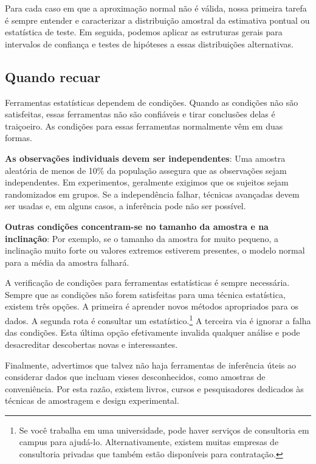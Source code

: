 \documentclass[
]{book}
\theoremstyle{definition}
\theoremstyle{definition}
\theoremstyle{definition}
\theoremstyle{definition}
\theoremstyle{remark}
\begin{document}
Para cada caso em que a aproximação normal não é válida, nossa primeira tarefa é sempre entender e caracterizar a distribuição amostral da estimativa pontual ou estatística de teste. Em seguida, podemos aplicar as estruturas gerais para intervalos de confiança e testes de hipóteses a essas distribuições alternativas.

\hypertarget{whenToRetreat}{%
\subsection{Quando recuar}\label{whenToRetreat}}

Ferramentas estatísticas dependem de condições. Quando as condições não são satisfeitas, essas ferramentas não são confiáveis e tirar conclusões delas é traiçoeiro. As condições para essas ferramentas normalmente vêm em duas formas.

\textbf{As observações individuais devem ser independentes}: Uma amostra aleatória de menos de 10\% da população assegura que as observações sejam independentes. Em experimentos, geralmente exigimos que os sujeitos sejam randomizados em grupos. Se a independência falhar, técnicas avançadas devem ser usadas e, em alguns casos, a inferência pode não ser possível.

\textbf{Outras condições concentram-se no tamanho da amostra e na inclinação}: Por exemplo, se o tamanho da amostra for muito pequeno, a inclinação muito forte ou valores extremos estiverem presentes, o modelo normal para a média da amostra falhará.

A verificação de condições para ferramentas estatísticas é sempre necessária. Sempre que as condições não forem satisfeitas para uma técnica estatística, existem três opções. A primeira é aprender novos métodos apropriados para os dados. A segunda rota é consultar um estatístico.\footnote{Se você trabalha em uma universidade, pode haver serviços de consultoria em campus para ajudá-lo. Alternativamente, existem muitas empresas de consultoria privadas que também estão disponíveis para contratação.} A terceira via é ignorar a falha das condições. Esta última opção efetivamente invalida qualquer análise e pode desacreditar descobertas novas e interessantes.

Finalmente, advertimos que talvez não haja ferramentas de inferência úteis ao considerar dados que incluam vieses desconhecidos, como amostras de conveniência. Por esta razão, existem livros, cursos e pesquisadores dedicados às técnicas de amostragem e design experimental.
\end{document}
